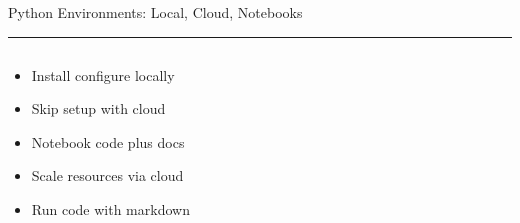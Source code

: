 \documentclass[aspectratio=169]{beamer}
\newcommand{\TitleFont}{\rmfamily}
\begin{document}
\begin{frame}[t]{}
  \vspace*{0.5cm}
  {\TitleFont\fontsize{18}{22}\selectfont\color{LUBronze}Python Environments: Local, Cloud, Notebooks\par}
  \vspace{0.3em}
  {\color{LUBronze}\rule{\linewidth}{0.8pt}}\par
  \vspace{0.2cm}
  \begin{columns}[t]
    \begin{column}[t]{0.4\textwidth}
      \vspace*{0pt}
      \begin{itemize}\setlength\itemsep{0.65em}
        \item Install configure locally
        \item Skip setup with cloud
        \item Notebook code plus docs
        \item Scale resources via cloud
        \item Run code with markdown
      \end{itemize}
    \end{column}
  \end{columns}
\end{frame}
\end{document}
